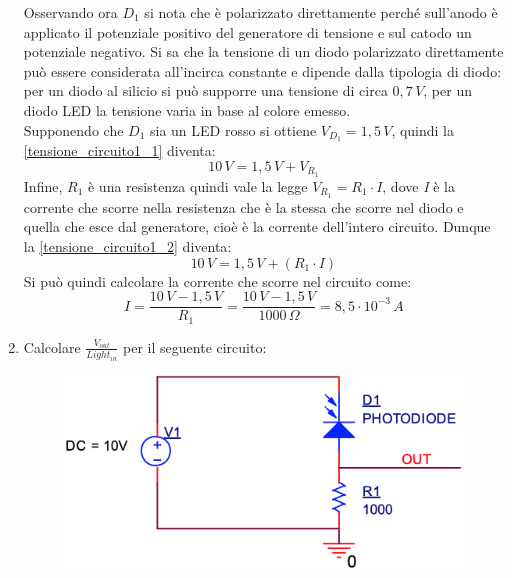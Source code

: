 \documentclass[12pt, a4paper]{report}
\begin{document}
\begin{appendices}
\begin{enumerate}
\begin{equation}
        \label{tensione_circuito1_1}
    \end{equation}
    Osservando ora $D_1$ si nota che è polarizzato direttamente perché sull'anodo è applicato il potenziale positivo del generatore di tensione e sul catodo un potenziale negativo. Si sa che la tensione di un diodo polarizzato direttamente può essere considerata all'incirca constante e dipende dalla tipologia di diodo: per un diodo al silicio si può supporre una tensione di circa $0,7\,V$, per un diodo LED la tensione varia in base al colore emesso.\\Supponendo che $D_1$ sia un LED rosso si ottiene $V_{D_1} = 1,5\,V$, quindi la \eqref{tensione_circuito1_1} diventa:
    \begin{equation}
        10\,V = 1,5\,V + V_{R_1}
        \label{tensione_circuito1_2}
    \end{equation}
    Infine, $R_1$ è una resistenza quindi vale la legge $V_{R_1} = R_{1} \cdot I$, dove \textit{I} è la corrente che scorre nella resistenza che è la stessa che scorre nel diodo e quella che esce dal generatore, cioè è la corrente dell'intero circuito. Dunque la \eqref{tensione_circuito1_2} diventa:
    \begin{equation*}
        10\,V = 1,5\,V + (R_1 \cdot I)
    \end{equation*}
    Si può quindi calcolare la corrente che scorre nel circuito come:
    \begin{equation*}
        I = \frac{10\,V - 1,5\,V}{R_1} = \frac{10\,V - 1,5\,V}{1000\,\Omega} = 8,5 \cdot 10^{-3}\,A
    \end{equation*}
    \newpage
    \item Calcolare $\frac{V_{out}}{Light_{in}}$ per il seguente circuito:
    \begin{figure}[ht]
        \centering
        \includegraphics[scale=0.3,angle=0]{diodi_es2.png}
    \end{figure}

\end{enumerate}
\end{appendices}
\end{document}
